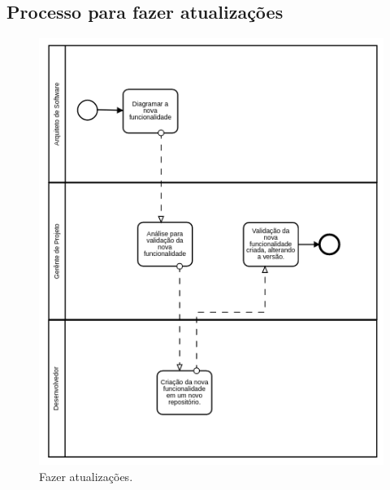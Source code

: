 \documentclass{article}
\begin{document}
        \subsection{Processo para fazer atualizações}
			\begin{figure}[H]
				\includegraphics[width=\linewidth]{processo_nova_funcionalidade}
				\caption{Fazer atualizações.}
				\label{fig:processonovafuncionalidade}
			\end{figure}
\end{document}
